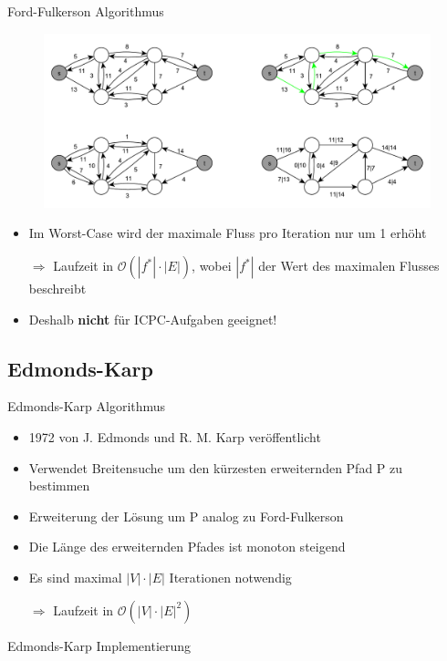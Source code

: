 \documentclass[18pt]{beamer}
\begin{document}
\begin{frame}{Ford-Fulkerson Algorithmus}
\begin{figure}
\includegraphics[width = \textwidth]{img/Jakob_Ford2.pdf}
\end{figure}
\begin{itemize}
	\item Im Worst-Case wird der maximale Fluss pro Iteration nur um 1 erh\"oht
	\item[$\Rightarrow$]  Laufzeit in $\mathcal O(|f^*|\cdot |E|)$, wobei $|f^*|$ der Wert des maximalen Flusses beschreibt
	\item Deshalb \textbf{nicht} f\"ur ICPC-Aufgaben geeignet!
\end{itemize}
\end{frame}

\subsection{Edmonds-Karp}
\begin{frame}{Edmonds-Karp Algorithmus}
\begin{itemize}
\item 1972 von J. Edmonds und R. M. Karp ver\"offentlicht
\item Verwendet Breitensuche um den k\"urzesten erweiternden Pfad P zu bestimmen
\item Erweiterung der L\"osung um P analog zu Ford-Fulkerson
\item Die L\"ange des erweiternden Pfades ist monoton steigend
\item Es sind maximal $|V|\cdot |E|$ Iterationen notwendig
\item[$\Rightarrow$] Laufzeit in $\mathcal O(|V| \cdot |E|^2)$
\end{itemize}
\end{frame}

\begin{frame}{Edmonds-Karp Implementierung}
\SetEndCharOfAlgoLine{}
\begin{algorithm}[H]
	\caption{Edmonds-Karp}
\end{algorithm}
\end{frame}
\end{document}
